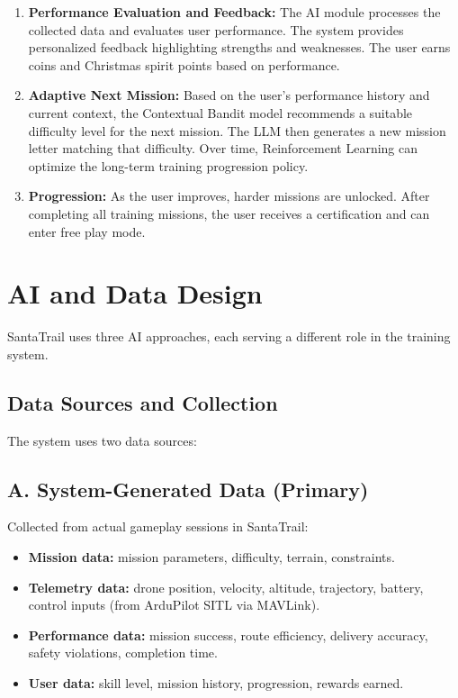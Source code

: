 \begin{enumerate}
    \item \textbf{Performance Evaluation and Feedback:} The AI module processes the collected data and evaluates user performance. The system provides personalized feedback highlighting strengths and weaknesses. The user earns coins and Christmas spirit points based on performance.
    
    \item \textbf{Adaptive Next Mission:} Based on the user's performance history and current context, the Contextual Bandit model recommends a suitable difficulty level for the next mission. The LLM then generates a new mission letter matching that difficulty. Over time, Reinforcement Learning can optimize the long-term training progression policy.
    
    \item \textbf{Progression:} As the user improves, harder missions are unlocked. After completing all training missions, the user receives a certification and can enter free play mode.
\end{enumerate}

\section{AI and Data Design}

SantaTrail uses three AI approaches, each serving a different role in the training system.

\subsection{Data Sources and Collection}

The system uses two data sources:

\subsection*{A. System-Generated Data (Primary)}

Collected from actual gameplay sessions in SantaTrail:
\begin{itemize}
    \item \textbf{Mission data:} mission parameters, difficulty, terrain, constraints.
    \item \textbf{Telemetry data:} drone position, velocity, altitude, trajectory, battery, control inputs (from ArduPilot SITL via MAVLink).
    \item \textbf{Performance data:} mission success, route efficiency, delivery accuracy, safety violations, completion time.
    \item \textbf{User data:} skill level, mission history, progression, rewards earned.
\end{itemize}

